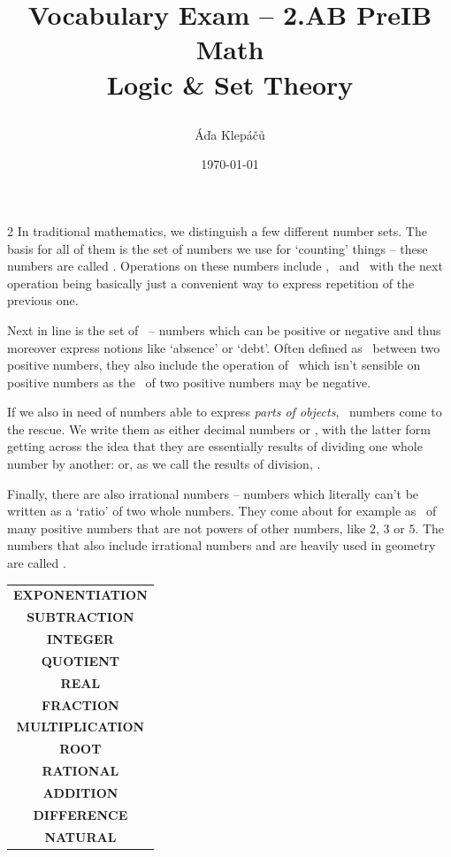 \documentclass[a4paper,11pt]{article}
\title{\Huge\textsf{Vocabulary Exam -- 2.AB PreIB Math}\\
  \Large\textsf{Logic \& Set Theory}
  \author{Áďa Klepáčů}
  \date{\today}
}
\newcommand{\blank}{\underline{\hspace{12ex}}}
\begin{document}
\thispagestyle{fancy}


\begin{paracol}{2}
  In traditional mathematics, we distinguish a few different number sets. The
  basis for all of them is the set of numbers we use for `counting' things --
  these numbers are called \blank. Operations on these numbers include \blank,
  \blank~and \blank~with the next operation being basically just a convenient
  way to express repetition of the previous one.
  
  Next in line is the set of \blank~-- numbers which can be positive or negative
  and thus moreover express notions like `absence' or `debt'. Often defined as
  \blank~between two positive numbers, they also include the operation of
  \blank~which isn't sensible on positive numbers as the \blank~of two positive
  numbers may be negative.

  If we also in need of numbers able to express \emph{parts of objects},
  \blank~numbers come to the rescue. We write them as either decimal numbers or
  \blank, with the latter form getting across the idea that they are essentially
  results of dividing one whole number by another: or, as we call the results of
  division, \blank.

  Finally, there are also irrational numbers -- numbers which literally can't be
  written as a `ratio' of two whole numbers. They come about for example as
  \blank~of many positive numbers that are not powers of other numbers, like
  $2$, $3$ or $5$. The numbers that also include irrational numbers and are
  heavily used in geometry are called \blank.

  \switchcolumn
  \renewcommand{\arraystretch}{2}
  \vspace*{-32pt}
  \begin{tabular}{c}
    \textbf{EXPONENTIATION}\\
    \textbf{SUBTRACTION}\\
    \textbf{INTEGER}\\
    \textbf{QUOTIENT}\\
    \textbf{REAL}\\
    \textbf{FRACTION}\\
    \textbf{MULTIPLICATION}\\
    \textbf{ROOT}\\
    \textbf{RATIONAL}\\
    \textbf{ADDITION}\\
    \textbf{DIFFERENCE}\\
    \textbf{NATURAL}\\
  \end{tabular}
\end{paracol}
\end{document}
